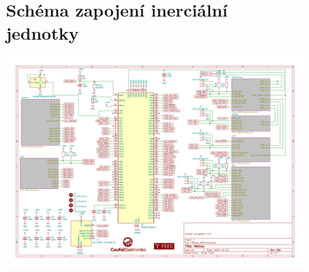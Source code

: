 

\chapter{Schéma zapojení inerciální jednotky} \label{schemaApp}
\includegraphics[angle=90, page=1, width=\textwidth]{KiCad/schematic.pdf}


